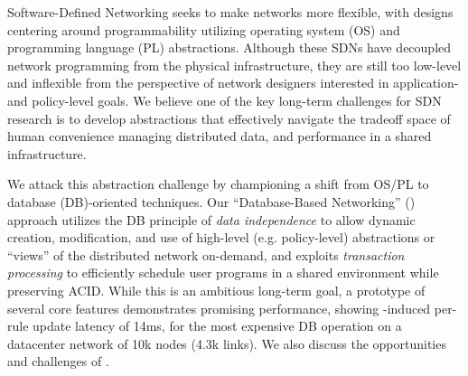 Software-Defined Networking seeks to make networks more flexible, with
designs centering around programmability utilizing operating system
(OS) and programming language (PL) abstractions.  Although these SDNs
have decoupled network programming from the physical infrastructure,
they are still too low-level and inflexible from the perspective of
network designers interested in application- and policy-level goals.
We believe one of the key long-term challenges for SDN research is to
develop abstractions that effectively navigate the tradeoff space of
human convenience managing distributed data, and performance in a shared
infrastructure.

We attack this abstraction challenge by championing a shift from OS/PL
to database (DB)-oriented techniques. Our ``Database-Based
Networking'' (\Sys) approach utilizes the DB principle of \emph{data
independence} to allow dynamic creation, modification, and use of
high-level (e.g. policy-level) abstractions or ``views'' of the
distributed network on-demand, and exploits \emph{transaction
processing} to efficiently schedule user programs in a shared
environment while preserving ACID. While this is an ambitious
long-term goal, a prototype of several core features demonstrates
promising performance, showing \Sys-induced per-rule update latency
of 14ms, for the most expensive DB operation on a datacenter
network of 10k nodes (4.3k links). We also discuss the opportunities
and challenges of \Sys.



